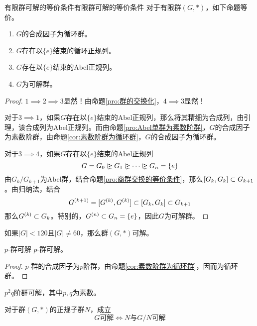 \begin{proposition}{有限群可解的等价条件}{有限群可解的等价条件}
	对于有限群$(G,*)$，如下命题等价。
	\begin{enumerate}
		\item $G$的合成因子为循环群。
		\item $G$存在以$\{e\}$结束的循环正规列。
		\item $G$存在以$\{e\}$结束的Abel正规列。
		\item $G$为可解群。
	\end{enumerate}
\end{proposition}

\begin{proof}
	$1\implies 2\implies 3$显然！由命题\ref{pro:群的交换化}，$4\implies 3$显然！
	
	对于$3\implies 1$，如果$G$存在以$\{e\}$结束的Abel正规列，那么将其精细为合成列，由引理，该合成列为Abel正规列。而由命题\ref{pro:Abel单群为素数阶群}，$G$的合成因子为素数阶群，由命题\ref{cor:素数阶群为循环群}，$G$的合成因子为循环群。
	
	对于$3\implies 4$，如果$G$存在以$\{e\}$结束的Abel正规列
	$$
	G=G_0\rhdneq G_1\rhdneq \cdots\rhdneq G_n=\{e\}
	$$
	由$G_{k}/G_{k+1}$为Abel群，结合命题\ref{pro:商群交换的等价条件}，那么$[G_{k},G_{k}]\subset G_{k+1}$。由归纳法，结合
	$$
	G^{(k+1)}=[G^{(k)},G^{(k)}]\subset [G_k,G_k]\subset G_{k+1}
	$$
	那么$G^{(k)}\subset G_{k}$。特别的，$G^{(n)}\subset G_n=\{e\}$，因此$G$为可解群。
\end{proof}

\begin{corollary}
	如果$|G|<120$且$|G|\ne 60$，那么群$(G,*)$可解。
\end{corollary}

\begin{corollary}{$p$-群可解}
	$p$-群可解。
\end{corollary}

\begin{proof}
	$p$-群的合成因子为$p$阶群，由命题\ref{cor:素数阶群为循环群}，因而为循环群。
\end{proof}

\begin{corollary}
	$p^2q$阶群可解，其中$p,q$为素数。
\end{corollary}

\begin{corollary}
	对于群$(G,*)$的正规子群$N$，成立
	$$
	G\text{可解}\iff N\text{与}G/N\text{可解}
	$$
\end{corollary}

